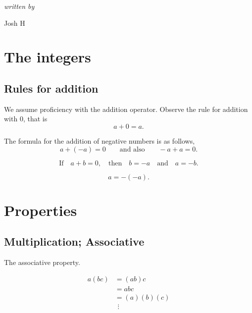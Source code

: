 \documentclass{amsbook}
\begin{document}
	\begin{titlepage}
		\centering
		\Huge{} \par \vspace{8cm}
		\small{\textit{written by}} \par
		\Large{Josh H}
	\end{titlepage}

\chapter{The integers}
\section{Rules for addition}
	We assume proficiency with the addition operator.
	Observe the rule for addition with $0$, that is
	\begin{equation} \label{eq:adding_zero}
		a + 0 = a.
	\end{equation}

	The formula for the addition of negative numbers is as follows,
	\begin{equation} \label{eq:adding_negatives}
		a + (-a) = 0 \quad\quad \text{and also} \quad\quad -a + a = 0.
	\end{equation}

	\begin{equation}
		\text{If} \quad a + b = 0, \quad \text{then} \quad b = -a \quad \text{and} \quad
		a = -b.
	\end{equation}
	
	\begin{equation}
		a = -(-a).
	\end{equation}
	
\chapter{Properties}
\section{Multiplication; Associative}
	The associative property.

	\begin{align*}
		a(bc) 	&= (ab)c		\\
				&= abc			\\
				&= (a)(b)(c)	\\
				&\hspace{5pt} \vdots
	\end{align*}
\end{document}
